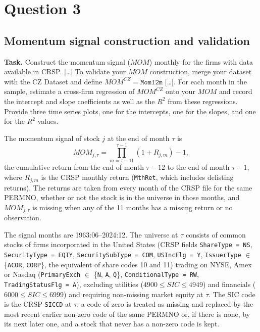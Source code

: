 \documentclass[11pt]{article}
\makeatletter
\newcommand{\MOM}{\mathit{MOM}}
\newcommand{\task}[1]{\par\if@nobreak\else\needspace{5\baselineskip}\fi\medskip\noindent
  \begin{minipage}{\linewidth}\textbf{Task.} #1\end{minipage}\par   %
  \nopagebreak\medskip\@afterheading}   %
\makeatother
\begin{document}
\section{Question 3}

\subsection{Momentum signal construction and validation}

\task{Construct the momentum signal ($\MOM$) monthly for the firms with data available in CRSP.
[\dots] To validate your $\MOM$ construction, merge your dataset with the CZ Dataset and define
$\MOM^{CZ} = \texttt{Mom12m}$ [\dots]. For each month in the sample, estimate a cross-firm
regression of $\MOM^{CZ}$ onto your $\MOM$ and record the intercept and slope coefficients as
well as the $R^2$ from these regressions. Provide three time series plots, one for the
intercepts, one for the slopes, and one for the $R^2$ values.}

The momentum signal of stock $j$ at the end of month $\tau$ is
\begin{equation}
  \MOM_{j,\tau} = \prod_{m=\tau-11}^{\tau-1} \left(1 + R_{j,m}\right) - 1,
  \label{eq:q3a_mom}
\end{equation}
the cumulative return from the end of month $\tau-12$ to the end of month $\tau-1$, where
$R_{j,m}$ is the CRSP monthly return (\texttt{MthRet}, which includes delisting returns). The
returns are taken from every month of the CRSP file for the same PERMNO, whether or not the
stock is in the universe in those months, and $\MOM_{j,\tau}$ is missing when any of the 11
months has a missing return or no observation.

The signal months are 1963:06--2024:12. The universe at $\tau$ consists of common stocks of
firms incorporated in the United States (CRSP fields \texttt{ShareType = NS},
\texttt{SecurityType = EQTY}, \texttt{SecuritySubType = COM}, \texttt{USIncFlg = Y},
\texttt{IssuerType} $\in$ \{\texttt{ACOR}, \texttt{CORP}\}, the equivalent of share codes 10
and 11) trading on NYSE, Amex or Nasdaq (\texttt{PrimaryExch} $\in$ \{\texttt{N}, \texttt{A},
\texttt{Q}\}, \texttt{ConditionalType = RW}, \texttt{TradingStatusFlg = A}), excluding
utilities ($4900 \le \mathit{SIC} \le 4949$) and financials ($6000 \le \mathit{SIC} \le 6999$)
and requiring non-missing market equity at $\tau$. The SIC code is the CRSP \texttt{SICCD} at
$\tau$; a code of zero is treated as missing and replaced by the most recent earlier non-zero
code of the same PERMNO or, if there is none, by its next later one, and a stock that never
has a non-zero code is kept.
\end{document}
